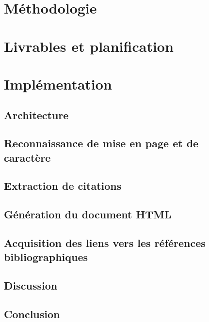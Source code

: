 \documentclass[12pt]{report}
\begin{document}
\section{Méthodologie}


\section{Livrables et planification}


\section{Implémentation}
\subsection{Architecture}


\subsection{Reconnaissance de mise en page et de caractère}


\subsection{Extraction de citations}


\subsection{Génération du document HTML}


\subsection{Acquisition des liens vers les références bibliographiques}


\subsection{Discussion}


\subsection{Conclusion}

\end{document}
